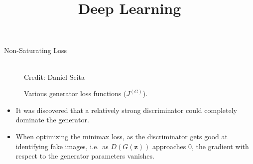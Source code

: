 




\title{Deep Learning}

\date{}


\newcommand{\titlefigure}{plots/named_gans.png}
\newcommand{\learninggoals}{
  \item non-saturating loss
  \item conditional GANs
}






\begin{frame} {Non-Saturating Loss}
  \begin{figure}
    \centering
      \tiny{\\Credit: Daniel Seita}
      \caption{\footnotesize Various generator loss functions ($J^{(G)}$).}
  \end{figure}
  \begin{itemize}
    \item It was discovered that a relatively strong discriminator could completely dominate the generator.
    \item %
   When optimizing the minimax loss, as the discriminator gets good at identifying fake images, i.e.~as $D(G(\mathbf{z}))$ approaches 0, the gradient with respect to the generator parameters vanishes.

  \end{itemize}
\end{frame}

